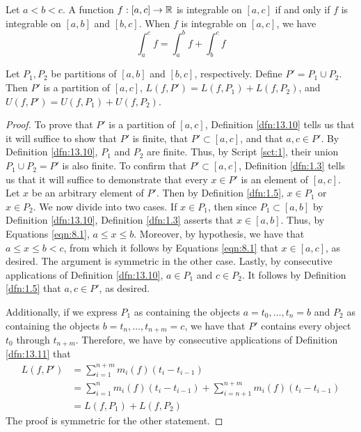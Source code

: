 \documentclass[../main.tex]{subfiles}
\begin{document}
\begin{theorem}\label{trm:13.23}
    Let $a<b<c$. A function $f:[a,c]\to\mathbb{R}$ is integrable on $[a,c]$ if and only if $f$ is integrable on $[a,b]$ and $[b,c]$. When $f$ is integrable on $[a,c]$, we have
    \begin{equation*}
        \int_a^cf = \int_a^bf+\int_b^cf
    \end{equation*}
    \begin{lemma*}
        Let $P_1,P_2$ be partitions of $[a,b]$ and $[b,c]$, respectively. Define $P'=P_1\cup P_2$. Then $P'$ is a partition of $[a,c]$, $L(f,P')=L(f,P_1)+L(f,P_2)$, and $U(f,P')=U(f,P_1)+U(f,P_2)$.
        \begin{proof}
            To prove that $P'$ is a partition of $[a,c]$, Definition \ref{dfn:13.10} tells us that it will suffice to show that $P'$ is finite, that $P'\subset[a,c]$, and that $a,c\in P'$. By Definition \ref{dfn:13.10}, $P_1$ and $P_2$ are finite. Thus, by Script \ref{sct:1}, their union $P_1\cup P_2=P'$ is also finite. To confirm that $P'\subset[a,c]$, Definition \ref{dfn:1.3} tells us that it will suffice to demonstrate that every $x\in P'$ is an element of $[a,c]$. Let $x$ be an arbitrary element of $P'$. Then by Definition \ref{dfn:1.5}, $x\in P_1$ or $x\in P_2$. We now divide into two cases. If $x\in P_1$, then since $P_1\subset[a,b]$ by Definition \ref{dfn:13.10}, Definition \ref{dfn:1.3} asserts that $x\in[a,b]$. Thus, by Equations \ref{eqn:8.1}, $a\leq x\leq b$. Moreover, by hypothesis, we have that $a\leq x\leq b<c$, from which it follows by Equations \ref{eqn:8.1} that $x\in[a,c]$, as desired. The argument is symmetric in the other case. Lastly, by consecutive applications of Definition \ref{dfn:13.10}, $a\in P_1$ and $c\in P_2$. It follows by Definition \ref{dfn:1.5} that $a,c\in P'$, as desired.\par
            Additionally, if we express $P_1$ as containing the objects $a=t_0,\dots,t_n=b$ and $P_2$ as containing the objects $b=t_n,\dots,t_{n+m}=c$, we have that $P'$ contains every object $t_0$ through $t_{n+m}$. Therefore, we have by consecutive applications of Definition \ref{dfn:13.11} that
            \begin{align*}
                L(f,P') &= \sum_{i=1}^{n+m}m_i(f)(t_i-t_{i-1})\\
                &= \sum_{i=1}^nm_i(f)(t_i-t_{i-1})+\sum_{i=n+1}^{n+m}m_i(f)(t_i-t_{i-1})\\
                &= L(f,P_1)+L(f,P_2)
            \end{align*}
            The proof is symmetric for the other statement.

\end{proof}
\end{lemma*}
\end{theorem}
\end{document}
